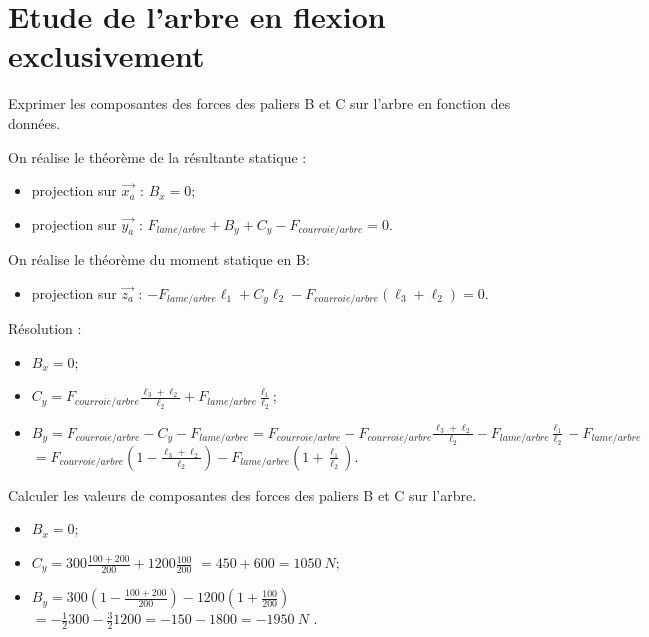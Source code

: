 \documentclass[11pt]{article}
\begin{document}
\section{Etude de l'arbre en flexion exclusivement}

\UPSTIquestion* Exprimer les composantes des forces des paliers B et C sur l'arbre en fonction des données.

\begin{UPSTIcorrige}
On réalise le théorème de la résultante statique : 
\begin{itemize}
\item projection sur $\overrightarrow{x_a}$ : $B_x   = 0$;
\item projection sur $\overrightarrow{y_a}$ : $F_{lame/arbre} + B_y + C_y - F_{courroie/arbre}  = 0$. 
\end{itemize}
On réalise le théorème du moment statique en B: 
\begin{itemize}
\item projection sur $\overrightarrow{z_a}$ : $-F_{lame/arbre} \ell_1 + C_y \ell_2 - F_{courroie/arbre}\left(\ell_3 + \ell_2\right)=0$.
\end{itemize}

Résolution :
\begin{itemize}
\item $B_x   = 0$;
\item $ C_y = F_{courroie/arbre}\frac{\ell_3 + \ell_2}{\ell_2} + F_{lame/arbre} \frac{\ell_1}{\ell_2}$;
\item $B_y = F_{courroie/arbre} -  C_y -  F_{lame/arbre} = F_{courroie/arbre} -F_{courroie/arbre}\frac{\ell_3 + \ell_2}{\ell_2} - F_{lame/arbre} \frac{\ell_1}{\ell_2}-  F_{lame/arbre} $
$= F_{courroie/arbre}\left(1-\frac{\ell_3 + \ell_2}{\ell_2}\right) - F_{lame/arbre} \left(1+\frac{\ell_1}{\ell_2}\right) $.
\end{itemize}

\end{UPSTIcorrige}

\UPSTIquestion Calculer les valeurs de composantes des forces des paliers B et C sur l'arbre.

\begin{UPSTIcorrige}
\begin{itemize}
\item $B_x   = 0$;
\item $C_y = 300 \frac{100 + 200}{200} + 1200 \frac{100}{200}$ $= 450 + 600 = \SI{1050}{N}$;
\item $B_y = 300\left(1-\frac{100+ 200}{200}\right) - 1200 \left(1+\frac{100}{200}\right) $ 
$=-\frac{1}{2}300 - \frac{3}{2}1200 = -150 - 1800 = -\SI{1950}{N} $ .
\end{itemize}\end{UPSTIcorrige}
\end{document}
